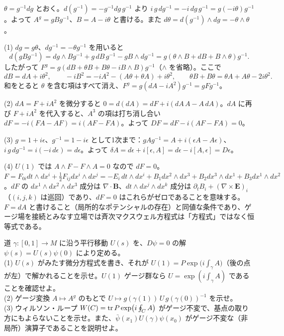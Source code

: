 \begin{solution}
$\theta=g^{-1}dg$ とおく。$d(g^{-1})=-g^{-1}dg\,g^{-1}$ より $i\,g\,dg^{-1}=-i\,dg\,g^{-1}=g(-i\theta)g^{-1}$。よって $A^g=gBg^{-1}$、$B=A-i\theta$ と書ける。また $d\theta=d(g^{-1})\wedge dg=-\theta\wedge\theta$。

(1) $dg=g\theta$、$dg^{-1}=-\theta g^{-1}$ を用いると
\[
d(gBg^{-1})=dg\wedge Bg^{-1}+g\,dB\,g^{-1}-gB\wedge dg^{-1}=g(\theta\wedge B+dB+B\wedge\theta)g^{-1}.
\]
したがって $F^g=g(dB+\theta B+B\theta-iB\wedge B)g^{-1}$（$\wedge$ を省略）。ここで
\[
dB=dA+i\theta^2,\qquad -iB^2=-iA^2-(A\theta+\theta A)+i\theta^2,\qquad\theta B+B\theta=\theta A+A\theta-2i\theta^2 .
\]
和をとると $\theta$ を含む項はすべて消え、$F^g=g(dA-iA^2)g^{-1}=gFg^{-1}$。

(2) $dA=F+iA^2$ を微分すると $0=d(dA)=dF+i(dA\,A-A\,dA)$。$dA$ に再び $F+iA^2$ を代入すると、$A^3$ の項は打ち消し合い $dF=-i(FA-AF)=i(AF-FA)$。よって $DF=dF-i(AF-FA)=0$。

(3) $g=1+i\epsilon$、$g^{-1}=1-i\epsilon$ として1次まで：$gAg^{-1}=A+i(\epsilon A-A\epsilon)$、$i\,g\,dg^{-1}=i(-i\,d\epsilon)=d\epsilon$。よって $\delta A=d\epsilon+i[\epsilon,A]=d\epsilon-i[A,\epsilon]=D\epsilon$。

(4) $U(1)$ では $A\wedge F-F\wedge A=0$ なので $dF=0$。$F=F_{0i}dt\wedge dx^i+\tfrac12F_{ij}dx^i\wedge dx^j=-E_i\,dt\wedge dx^i+B_1dx^2\wedge dx^3+B_2dx^3\wedge dx^1+B_3dx^1\wedge dx^2$。$dF$ の $dx^1\wedge dx^2\wedge dx^3$ 成分は $\nabla\cdot\bm B$、$dt\wedge dx^j\wedge dx^k$ 成分は $\partial_tB_i+(\nabla\times\bm E)_i$（$(i,j,k)$ は巡回）であり、$dF=0$ はこれらがゼロであることを意味する。$F=dA$ と書けること（局所的なポテンシャルの存在）と同値な条件であり、ゲージ場を接続とみなす立場では斉次マクスウェル方程式は「方程式」ではなく恒等式である。
\end{solution}

\begin{problem}[難易度 B]\label{ch08-prob-transport}
道 $\gamma\colon[0,1]\to M$ に沿う平行移動 $U(s)$ を、$D\psi=0$ の解 $\psi(s)=U(s)\psi(0)$ により定める。\\
(1) $U(s)$ がみたす微分方程式を書き、それが $U(1)=P\exp\bigl(i\int_\gamma A\bigr)$（後の点が左）で解かれることを示せ。$U(1)$ ゲージ群なら $U=\exp(i\int_\gamma A)$ であることを確認せよ。\\
(2) ゲージ変換 $A\mapsto A^g$ のもとで $U\mapsto g(\gamma(1))\,U\,g(\gamma(0))^{-1}$ を示せ。\\
(3) ウィルソン・ループ $W(C)=\tr P\exp(i\oint_CA)$ がゲージ不変で、基点の取り方にもよらないことを示せ。また、$\bar\psi(x_1)U(\gamma)\psi(x_0)$ がゲージ不変な（非局所）演算子であることを説明せよ。
\end{problem}

